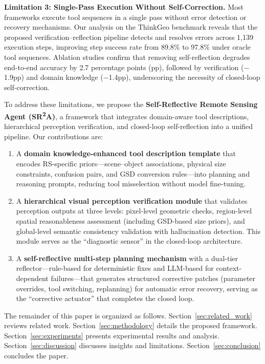\documentclass[journal]{IEEEtran}
\begin{document}
\textbf{Limitation 3: Single-Pass Execution Without Self-Correction.}
Most frameworks execute tool sequences in a single pass without error detection or recovery mechanisms.
Our analysis on the ThinkGeo benchmark reveals that the proposed verification--reflection pipeline detects and resolves errors across 1{,}139 execution steps, improving step success rate from 89.8\% to 97.8\% under oracle tool sequences.
Ablation studies confirm that removing self-reflection degrades end-to-end accuracy by 2.7 percentage points (pp), followed by verification ($-$1.9pp) and domain knowledge ($-$1.4pp), underscoring the necessity of closed-loop self-correction.

To address these limitations, we propose the \textbf{Self-Reflective Remote Sensing Agent (SR\textsuperscript{2}A)}, a framework that integrates domain-aware tool descriptions, hierarchical perception verification, and closed-loop self-reflection into a unified pipeline.
Our contributions are:

\begin{enumerate}[leftmargin=*]
    \item A \textbf{domain knowledge-enhanced tool description template} that encodes RS-specific priors---scene--object associations, physical size constraints, confusion pairs, and GSD conversion rules---into planning and reasoning prompts, reducing tool misselection without model fine-tuning.

    \item A \textbf{hierarchical visual perception verification module} that validates perception outputs at three levels: pixel-level geometric checks, region-level spatial reasonableness assessment (including GSD-based size priors), and global-level semantic consistency validation with hallucination detection. This module serves as the ``diagnostic sensor'' in the closed-loop architecture.

    \item A \textbf{self-reflective multi-step planning mechanism} with a dual-tier reflector---rule-based for deterministic fixes and LLM-based for context-dependent failures---that generates structured corrective patches (parameter overrides, tool switching, replanning) for automatic error recovery, serving as the ``corrective actuator'' that completes the closed loop.
\end{enumerate}

The remainder of this paper is organized as follows.
Section~\ref{sec:related_work} reviews related work.
Section~\ref{sec:methodology} details the proposed framework.
Section~\ref{sec:experiments} presents experimental results and analysis.
Section~\ref{sec:discussion} discusses insights and limitations.
Section~\ref{sec:conclusion} concludes the paper.
\end{document}
